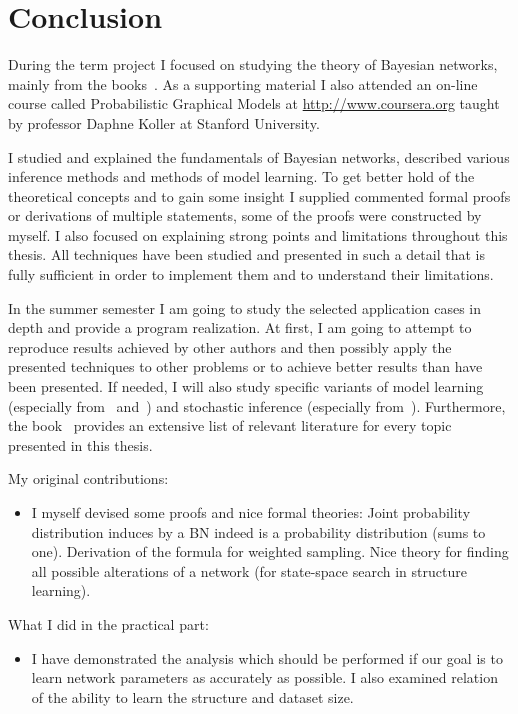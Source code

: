 \documentclass[english,cover]{fitthesis} %
\begin{document}
\chapter{Conclusion}
During the term project I focused on studying the theory of Bayesian networks, mainly from the books~\cite{pgm,russell_norvig_ed2}. As a supporting material I also attended an on-line course called Probabilistic Graphical Models at \url{http://www.coursera.org} taught by professor Daphne Koller at Stanford University.

I studied and explained the fundamentals of Bayesian networks, described various inference methods and methods of model learning. To get better hold of the theoretical concepts and to gain some insight I supplied commented formal proofs or derivations of multiple statements, some of the proofs were constructed by myself. I also focused on explaining strong points and limitations throughout this thesis. All techniques have been studied and presented in such a detail that is fully sufficient in order to implement them and to understand their limitations.

\medskip

In the summer semester I am going to study the selected application cases in depth and provide a program realization. At first, I am going to attempt to reproduce results achieved by other authors and then possibly apply the presented techniques to other problems or to achieve better results than have been presented. If needed, I will also study specific variants of model learning (especially from~\cite{heckerman96_tutorial} and~\cite{buntine94}) and stochastic inference (especially from~\cite{neal93}). Furthermore, the book~\cite{pgm} provides an extensive list of relevant literature for every topic presented in this thesis. %

My original contributions:
\begin{itemize}
	\item I myself devised some proofs and nice formal theories: Joint probability distribution induces by a BN indeed is a probability distribution (sums to one). Derivation of the formula for weighted sampling. Nice theory for finding all possible alterations of a network (for state-space search in structure learning).
\end{itemize}

What I did in the practical part:
\begin{itemize}
    \item I have demonstrated the analysis which should be performed if our goal is to learn network parameters as accurately as possible. I also examined relation of the ability to learn the  structure and dataset size.
\end{itemize}
\end{document}
